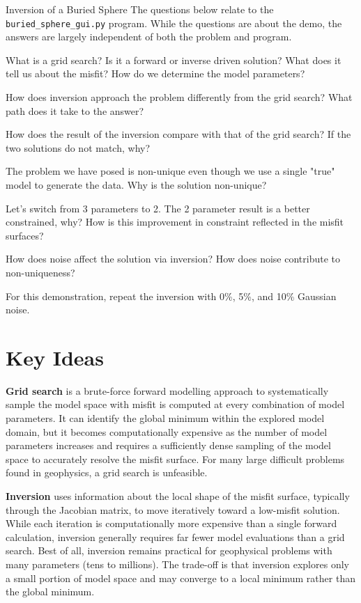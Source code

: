 \begin{activity}{Inversion of a Buried Sphere}
The questions below relate to the \verb+buried_sphere_gui.py+ program. While the questions are about the demo, the answers are largely independent of both the problem and program.

\clearpage
\begin{questions}[resume]
    What is a grid search? Is it a forward or inverse driven solution? What does it tell us about the misfit? How do we determine the model parameters?
    \answerbox

    How does inversion approach the problem differently from the grid search?  What path does it take to the answer?
    \answerbox

    How does the result of the inversion compare with that of the grid search? If the two solutions do not match, why?
    \answerbox

    \clearpage
    The problem we have posed is non-unique even though we use a single "true" model to generate the data.  Why is the solution non-unique?
    \answerbox

    Let's switch from 3 parameters to 2.  The 2 parameter result is a better constrained, why?  How is this improvement in constraint reflected in the misfit surfaces?
    \answerbox

    How does noise affect the solution via inversion?  How does noise contribute to non-uniqueness?

    For this demonstration, repeat the inversion with 0\%, 5\%, and 10\% Gaussian noise.
    \answerbox
\end{questions}

\section*{Key Ideas}

\textbf{Grid search} is a brute-force forward modelling approach to systematically sample the model space with misfit is computed at every combination of model parameters. It can identify the global minimum within the explored model domain, but it becomes computationally expensive as the number of model parameters increases and requires a sufficiently dense sampling of the model space to accurately resolve the misfit surface. For many large difficult problems found in geophysics, a grid search is unfeasible.

\textbf{Inversion} uses information about the local shape of the misfit surface, typically through the Jacobian matrix, to move iteratively toward a low-misfit solution. While each iteration is computationally more expensive than a single forward calculation, inversion generally requires far fewer model evaluations than a grid search.  Best of all, inversion remains practical for geophysical problems with many parameters (tens to millions). The trade-off is that inversion explores only a small portion of model space and may converge to a local minimum rather than the global minimum.


\end{activity}
